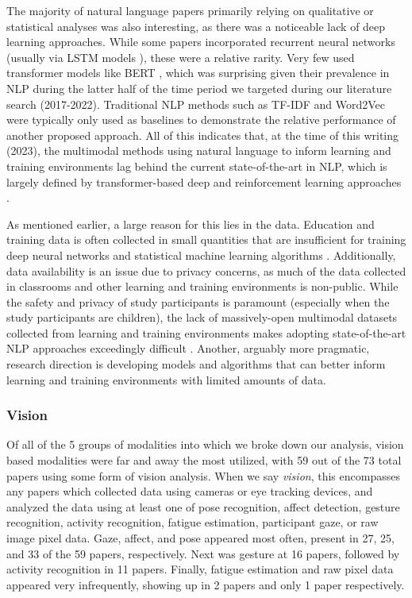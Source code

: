 \documentclass[manuscript,screen,review]{acmart}
\begin{document}
The majority of natural language papers primarily relying on qualitative or statistical analyses was also interesting, as there was a noticeable lack of deep learning approaches. While some papers incorporated recurrent neural networks (usually via LSTM models \cite{hochreiter1997long}), these were a relative rarity. Very few used transformer \cite{vaswani2017attention} models like BERT \cite{devlin2018bert}, which was surprising given their prevalence in NLP during the latter half of the time period we targeted during our literature search (2017-2022). Traditional NLP methods such as TF-IDF and Word2Vec \cite{mikolov2013efficient} were typically only used as baselines to demonstrate the relative performance of another proposed approach. All of this indicates that, at the time of this writing (2023), the multimodal methods using natural language to inform learning and training environments lag behind the current state-of-the-art in NLP, which is largely defined by transformer-based deep and reinforcement learning approaches \cite{touvron2023llama}.

As mentioned earlier, a large reason for this lies in the data. Education and training data is often collected in small quantities \cite{snyder2023using,snyder2023analyzing} that are insufficient for training deep neural networks and statistical machine learning algorithms \cite{957160695}. Additionally, data availability is an issue due to privacy concerns, as much of the data collected in classrooms and other learning and training environments is non-public. While the safety and privacy of study participants is paramount (especially when the study participants are children), the lack of massively-open multimodal datasets collected from learning and training environments makes adopting state-of-the-art NLP approaches exceedingly difficult \cite{3796643912}. Another, arguably more pragmatic, research direction is developing models and algorithms that can better inform learning and training environments with limited amounts of data.

\subsubsection{Vision}
Of all of the 5 groups of modalities into which we broke down our analysis, vision based modalities were far and away the most utilized, with 59 out of the 73 total papers using some form of vision analysis. When we say \textit{vision}, this encompasses any papers which collected data using cameras or eye tracking devices, and analyzed the data using at least one of pose recognition, affect detection, gesture recognition, activity recognition, fatigue estimation, participant gaze, or raw image pixel data. Gaze, affect, and pose appeared most often, present in 27, 25, and 33 of the 59 papers, respectively. Next was gesture at 16 papers, followed by activity recognition in 11 papers. Finally, fatigue estimation and raw pixel data appeared very infrequently, showing up in 2 papers and only 1 paper respectively.
\end{document}
